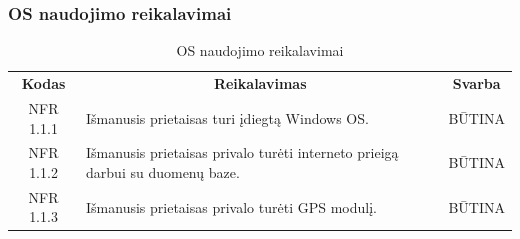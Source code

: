 \documentclass{VUMIFPSkursinis}
\begin{document}
\subsubsection{OS naudojimo reikalavimai}

\begin{center}
	\begin{table}[H]
	\caption{OS naudojimo reikalavimai}
	\begin{tabular}{|p{2cm}|p{}|p{}|}
	\hline
	    \rowcolor{lightgray}
		\multicolumn{3}{|c|}{Apsaugos reikalavimai}\\
		
	\hline
		\multicolumn{1}{|c|}{{\bfseries Kodas}}&
		\multicolumn{1}{|c|}{{\bfseries Reikalavimas}}&
		\multicolumn{1}{|c|}{{\bfseries Svarba}}\\
	\hline 	
		\multicolumn{1}{|c|}{NFR 1.1.1}&
		{Išmanusis prietaisas turi įdiegtą Windows OS.}&
		\multicolumn{1}{|c|}{BŪTINA}\\	
	
	\hline 	
		\multicolumn{1}{|c|}{NFR 1.1.2}&
		{Išmanusis prietaisas privalo turėti interneto prieigą darbui su duomenų baze.}&
		\multicolumn{1}{|c|}{BŪTINA}\\	
	
	\hline 	
		\multicolumn{1}{|c|}{NFR 1.1.3}&
		{Išmanusis prietaisas privalo turėti GPS modulį.}&
		\multicolumn{1}{|c|}{BŪTINA}\\	
	
	\hline 	 	
	\end{tabular}
	
	\label{table:OSnaudojimoreikalavimai}
	\end{table}

\end{center}
\end{document}
